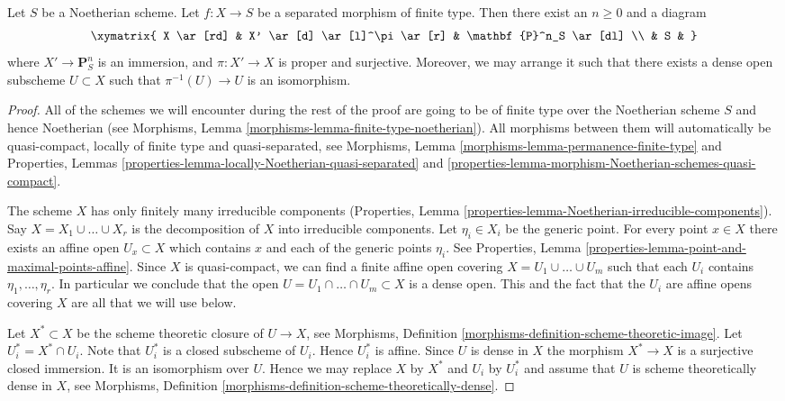 \begin{lemma}
\label{lemma-chow-Noetherian}
\begin{reference}
\cite[II Theorem 5.6.1(a)]{EGA}
\end{reference}
Let $S$ be a Noetherian scheme.
Let $f : X \to S$ be a separated morphism of finite type.
Then there exist an $n \geq 0$ and a diagram
$$
\xymatrix{
X \ar[rd] & X' \ar[d] \ar[l]^\pi \ar[r] & \mathbf{P}^n_S \ar[dl] \\
& S &
}
$$
where $X' \to \mathbf{P}^n_S$ is an immersion, and
$\pi : X' \to X$ is proper and surjective. Moreover, we may
arrange it such that there exists a dense open subscheme
$U \subset X$ such that $\pi^{-1}(U) \to U$ is an isomorphism.
\end{lemma}

\begin{proof}
All of the schemes we will encounter during the rest of the proof
are going to be of finite type over the Noetherian scheme $S$ and
hence Noetherian
(see Morphisms, Lemma \ref{morphisms-lemma-finite-type-noetherian}).
All morphisms between them will automatically be quasi-compact, locally of
finite type and quasi-separated, see
Morphisms, Lemma \ref{morphisms-lemma-permanence-finite-type} and
Properties,
Lemmas \ref{properties-lemma-locally-Noetherian-quasi-separated} and
\ref{properties-lemma-morphism-Noetherian-schemes-quasi-compact}.

\medskip\noindent
The scheme $X$ has only finitely many irreducible components
(Properties, Lemma \ref{properties-lemma-Noetherian-irreducible-components}).
Say $X = X_1 \cup \ldots \cup X_r$ is the decomposition
of $X$ into irreducible components.
Let $\eta_i \in X_i$ be the generic point.
For every point $x \in X$ there exists an affine open
$U_x \subset X$ which contains $x$ and each of the generic
points $\eta_i$. See
Properties, Lemma \ref{properties-lemma-point-and-maximal-points-affine}.
Since $X$ is quasi-compact, we can find a finite affine open
covering $X = U_1 \cup \ldots \cup U_m$ such that
each $U_i$ contains $\eta_1, \ldots, \eta_r$.
In particular we conclude that the open
$U = U_1 \cap \ldots \cap U_m \subset X$ is
a dense open. This and the fact that the $U_i$ are affine opens
covering $X$ are all that we will use below.

\medskip\noindent
Let $X^* \subset X$ be the scheme theoretic closure of $U \to X$, see
Morphisms, Definition \ref{morphisms-definition-scheme-theoretic-image}.
Let $U_i^* = X^* \cap U_i$. Note that $U_i^*$ is a closed subscheme
of $U_i$. Hence $U_i^*$ is affine. Since $U$ is dense in $X$ the
morphism $X^* \to X$ is a surjective closed immersion. It is an
isomorphism over $U$. Hence we may replace $X$ by $X^*$ and
$U_i$ by $U_i^*$ and assume that $U$ is scheme theoretically dense
in $X$, see
Morphisms, Definition \ref{morphisms-definition-scheme-theoretically-dense}.


\end{proof}
